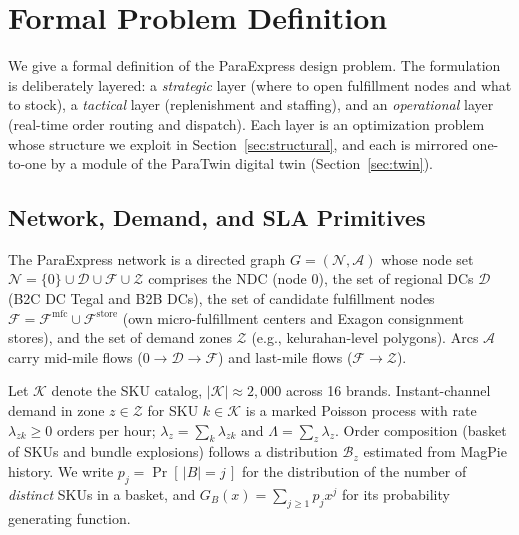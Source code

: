 \section{Formal Problem Definition}\label{sec:formal}

We give a formal definition of the ParaExpress design problem. The formulation is deliberately layered: a \emph{strategic} layer (where to open fulfillment nodes and what to stock), a \emph{tactical} layer (replenishment and staffing), and an \emph{operational} layer (real-time order routing and dispatch). Each layer is an optimization problem whose structure we exploit in Section~\ref{sec:structural}, and each is mirrored one-to-one by a module of the ParaTwin digital twin (Section~\ref{sec:twin}).

\subsection{Network, Demand, and SLA Primitives}

\begin{definition}
The ParaExpress network is a directed graph $G=(\mathcal{N},\mathcal{A})$ whose node set $\mathcal{N}=\{0\}\cup\mathcal{D}\cup\mathcal{F}\cup\mathcal{Z}$ comprises the NDC (node 0), the set of regional DCs $\mathcal{D}$ (B2C DC Tegal and B2B DCs), the set of candidate fulfillment nodes $\mathcal{F}=\mathcal{F}^{\mathrm{mfc}}\cup\mathcal{F}^{\mathrm{store}}$ (own micro-fulfillment centers and Exagon consignment stores), and the set of demand zones $\mathcal{Z}$ (e.g., kelurahan-level polygons). Arcs $\mathcal{A}$ carry mid-mile flows ($0\to\mathcal{D}\to\mathcal{F}$) and last-mile flows ($\mathcal{F}\to\mathcal{Z}$).
\end{definition}

\begin{definition}
Let $\mathcal{K}$ denote the SKU catalog, $|\mathcal{K}|\approx 2{,}000$ across 16 brands. Instant-channel demand in zone $z\in\mathcal{Z}$ for SKU $k\in\mathcal{K}$ is a marked Poisson process with rate $\lambda_{zk}\ge 0$ orders per hour; $\lambda_z=\sum_k\lambda_{zk}$ and $\Lambda=\sum_z\lambda_z$. Order composition (basket of SKUs and bundle explosions) follows a distribution $\mathcal{B}_z$ estimated from MagPie history. We write $p_j=\Pr[\,|B|=j\,]$ for the distribution of the number of \emph{distinct} SKUs in a basket, and $G_B(x)=\sum_{j\ge 1}p_jx^{j}$ for its probability generating function. 
\end{definition}

